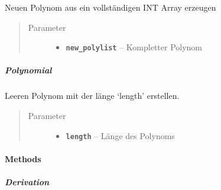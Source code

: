 \documentclass[letterpaper,10pt,ngerman]{sphinxmanual}
\begin{document}
\begin{fulllineitems}
\label{com/linuxluigi/polynomial/Polynomial:com.linuxluigi.polynomial.Polynomial.Polynomial(double__)}
Neuen Polynom aus ein vollständigen INT Array erzeugen
\begin{quote}\begin{description}
\item[{Parameter}] \leavevmode\begin{itemize}
\item {} 
\textbf{\texttt{new\_polylist}} -- Kompletter Polynom

\end{itemize}

\end{description}\end{quote}

\end{fulllineitems}



\subparagraph{Polynomial}
\label{com/linuxluigi/polynomial/Polynomial:id2}

\begin{fulllineitems}
\label{com/linuxluigi/polynomial/Polynomial:com.linuxluigi.polynomial.Polynomial.Polynomial(int)}
Leeren Polynom mit der länge `length' erstellen.
\begin{quote}\begin{description}
\item[{Parameter}] \leavevmode\begin{itemize}
\item {} 
\textbf{\texttt{length}} -- Länge des Polynoms

\end{itemize}

\end{description}\end{quote}

\end{fulllineitems}



\paragraph{Methods}
\label{com/linuxluigi/polynomial/Polynomial:methods}

\subparagraph{Derivation}
\label{com/linuxluigi/polynomial/Polynomial:derivation}
\end{document}
